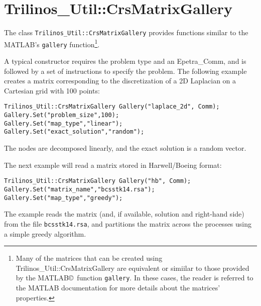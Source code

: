 
\section{Trilinos\_Util::CrsMatrixGallery}
\label{sec:triutils:gallery}

The class \verb!Trilinos_Util::CrsMatrixGallery! provides functions
similar to the MATLAB's \verb!gallery!  function\footnote{Many of the
  matrices that can be created using Trilinos\_Util::CrsMatrixGallery
  are equivalent or simiilar to those provided by the
  MATLAB\copyright~function {\tt gallery}. In these cases, the reader is
  referred to the MATLAB documentation for more details about the
  matrices' properties.}.

A typical constructor requires the problem type and an Epetra\_Comm, and
is followed by a set of instructions to specify the problem.  The
following example creates a matrix corresponding to the discretization
of a 2D Laplacian on a Cartesian grid with 100 points:
\begin{verbatim}
Trilinos_Util::CrsMatrixGallery Gallery("laplace_2d", Comm);
Gallery.Set("problem_size",100);
Gallery.Set("map_type","linear");
Gallery.Set("exact_solution","random");
\end{verbatim}
The nodes are decomposed linearly, and the exact solution is a random
vector.

The next example will read a matrix stored in Harwell/Boeing format:
\begin{verbatim}
Trilinos_Util::CrsMatrixGallery Gallery("hb", Comm);
Gallery.Set("matrix_name","bcsstk14.rsa");
Gallery.Set("map_type","greedy");
\end{verbatim}
The example reads the matrix (and, if available, solution and right-hand
side) from the file \verb!bcsstk14.rsa!, and partitions the matrix
across the processes using a simple greedy algorithm.

\bigskip

